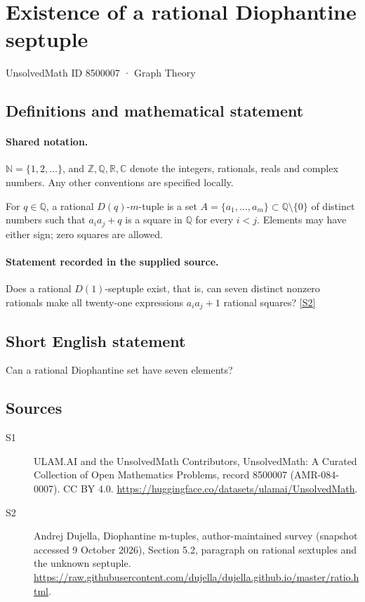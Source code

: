 \documentclass[11pt]{article}
\newcommand{\sref}[2]{\hyperlink{source:#1:#2}{[S#2]}}
\begin{document}
\setcounter{section}{8500006}
\section{Existence of a rational Diophantine septuple}\label{8500007}
{\small\sffamily UnsolvedMath ID 8500007 · Graph Theory}
\subsection{Definitions and mathematical statement}

\paragraph{Shared notation.}$\mathbb N=\{1,2,\ldots\}$, and $\mathbb Z,\mathbb Q,\mathbb R,\mathbb C$ denote the integers, rationals, reals and complex numbers. Any other conventions are specified locally.


For $q\in\mathbb Q$, a rational $D(q)$-$m$-tuple is a set $A=\{a_1,\ldots,a_m\}\subset\mathbb Q\setminus\{0\}$ of distinct numbers such that $a_i a_j+q$ is a square in $\mathbb Q$ for every $i<j$. Elements may have either sign; zero squares are allowed.
\paragraph{Statement recorded in the supplied source.}
Does a rational $D(1)$-septuple exist, that is, can seven distinct nonzero rationals make all twenty-one expressions $a_i a_j+1$ rational squares? \sref{8500007}{2}
\subsection{Short English statement}
Can a rational Diophantine set have seven elements?
\subsection{Sources}
\begin{description}
\item[\hypertarget{source:8500007:1}{S1}] ULAM.AI and the UnsolvedMath Contributors, UnsolvedMath: A Curated Collection of Open Mathematics Problems, record 8500007 (AMR-084-0007). CC BY 4.0. \url{https://huggingface.co/datasets/ulamai/UnsolvedMath}.
\item[\hypertarget{source:8500007:2}{S2}] Andrej Dujella, Diophantine m-tuples, author-maintained survey (snapshot accessed 9 October 2026), Section 5.2, paragraph on rational sextuples and the unknown septuple. \url{https://raw.githubusercontent.com/dujella/dujella.github.io/master/ratio.html}.
\end{description}
\label{end:8500007}
\end{document}
